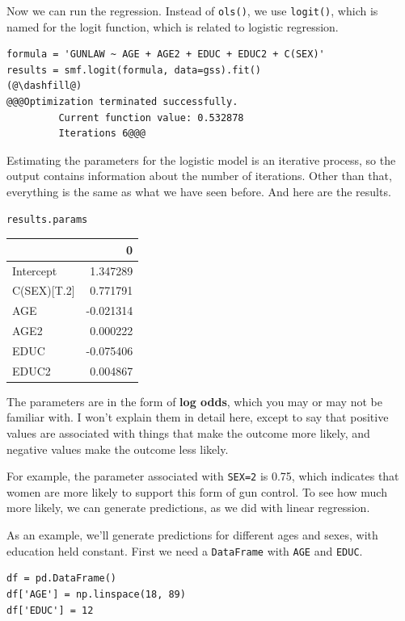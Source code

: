 Now we can run the regression. Instead of
\passthrough{\lstinline!ols()!}, we use
\passthrough{\lstinline!logit()!}, which is named for the logit
function, which is related to logistic regression.

\begin{lstlisting}[]
formula = 'GUNLAW ~ AGE + AGE2 + EDUC + EDUC2 + C(SEX)'
results = smf.logit(formula, data=gss).fit()
(@\dashfill@)
@@@Optimization terminated successfully.
         Current function value: 0.532878
         Iterations 6@@@
\end{lstlisting}

Estimating the parameters for the logistic model is an iterative
process, so the output contains information about the number of
iterations. Other than that, everything is the same as what we have seen
before. And here are the results.

\begin{lstlisting}[]
results.params
\end{lstlisting}

\begin{tabular}{lr}
\midrule
{} &         0 \\
\midrule
Intercept   &  1.347289 \\
C(SEX)[T.2] &  0.771791 \\
AGE         & -0.021314 \\
AGE2        &  0.000222 \\
EDUC        & -0.075406 \\
EDUC2       &  0.004867 \\
\midrule
\end{tabular}

The parameters are in the form of \textbf{log odds}, which you may or
may not be familiar with. I won't explain them in detail here, except to
say that positive values are associated with things that make the
outcome more likely, and negative values make the outcome less likely.

For example, the parameter associated with
\passthrough{\lstinline!SEX=2!} is 0.75, which indicates that women are
more likely to support this form of gun control. To see how much more
likely, we can generate predictions, as we did with linear regression.

As an example, we'll generate predictions for different ages and sexes,
with education held constant. First we need a
\passthrough{\lstinline!DataFrame!} with \passthrough{\lstinline!AGE!}
and \passthrough{\lstinline!EDUC!}.

\begin{lstlisting}[]
df = pd.DataFrame()
df['AGE'] = np.linspace(18, 89)
df['EDUC'] = 12
\end{lstlisting}

